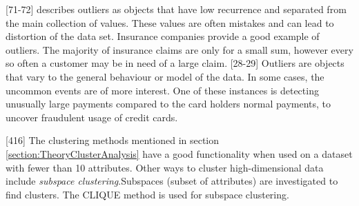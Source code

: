 




\textcite{dataPreparationForDataMining}[71-72] describes outliers as objects that have low recurrence and separated from the main collection of values. These values are often mistakes and can lead to distortion of the data set. Insurance companies provide a good example of outliers. The majority of insurance claims are only for a small sum, however every so often a customer may be in need of a large claim.
\textcite{han2011data}[28-29]
Outliers are objects that vary to the general behaviour or model of the data. In some cases, the uncommon events are of more interest. One of these instances is detecting unusually large payments compared to the card holders normal payments, to uncover fraudulent usage of credit cards.



\textcite{han2011data}[416]
The clustering methods mentioned in section \ref{section:TheoryClusterAnalysis} have a good functionality when used on a dataset with fewer than 10 attributes.
Other ways to cluster high-dimensional data include \textit{subspace clustering}.Subspaces (subset of attributes) are investigated to find clusters. The CLIQUE method is used for subspace clustering.




